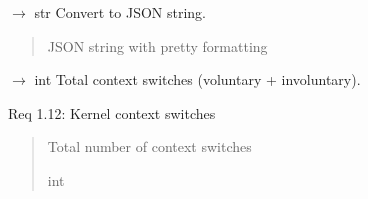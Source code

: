 \documentclass[letterpaper,10pt,english]{sphinxmanual}
\begin{document}
\begin{fulllineitems}
\begin{fulllineitems}
\begin{quote}
\begin{description}
\end{description}\end{quote}

\end{fulllineitems}


\begin{fulllineitems}
\label{\detokenize{core.models.performance_counters:core.models.performance_counters.PerformanceCounters.to_json}}
\pysigstartsignatures
\pysiglinewithargsret
{}
{}
{{ $\rightarrow$ str}}
\pysigstopsignatures
\sphinxAtStartPar
Convert to JSON string.
\begin{quote}\begin{description}
\sphinxAtStartPar
JSON string with pretty formatting

\end{description}\end{quote}

\end{fulllineitems}


\begin{fulllineitems}
\label{\detokenize{core.models.performance_counters:core.models.performance_counters.PerformanceCounters.total_context_switches}}
\pysigstartsignatures
\pysiglinewithargsret
{}
{}
{{ $\rightarrow$ int}}
\pysigstopsignatures
\sphinxAtStartPar
Total context switches (voluntary + involuntary).

\sphinxAtStartPar
Req 1.12: Kernel context switches
\begin{quote}\begin{description}
\sphinxAtStartPar
Total number of context switches

\sphinxAtStartPar
int

\end{description}\end{quote}

\end{fulllineitems}


\end{fulllineitems}
\end{document}
